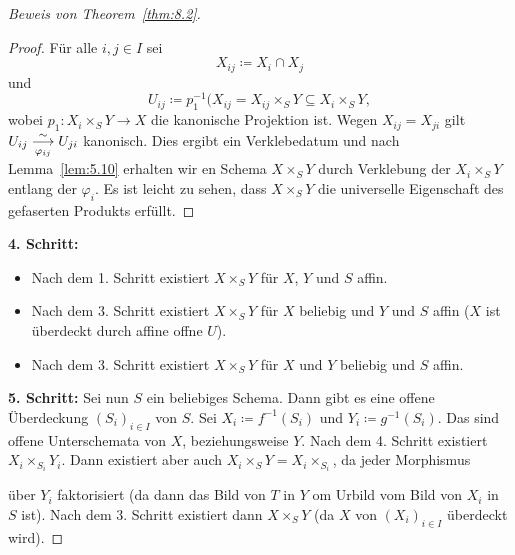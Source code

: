 \begin{proof}[Beweis von Theorem~\ref{thm:8.2}]
	\begin{proof}
		Für alle $i,j \in I$ sei
		\[
			X_{ij} \coloneqq X_i \cap X_j
		\]
		und
		\[
			U_{ij} \coloneqq p_1^{-1}(X_{ij} = X_{ij}\times_S Y \subseteq X_i \times_S Y,
		\]
		wobei $p_1 \colon X_i \times_S Y \to X$ die kanonische Projektion ist. Wegen $X_{ij} = X_{ji}$ gilt $U_{ij} \underset{\varphi_{ij}}{\overset{\sim}{\longrightarrow}}U_{ji}$ kanonisch. Dies ergibt ein Verklebedatum und nach Lemma~\ref{lem:5.10} erhalten wir en Schema $X\times_S Y$ durch Verklebung der $X_i\times_S Y$ entlang der $\varphi_{i}$. Es ist leicht zu sehen, dass $X \times_S Y$ die universelle Eigenschaft des gefaserten Produkts erfüllt.
	\end{proof}
	\textbf{4. Schritt:}\\
	\begin{itemize}
		\item Nach dem 1. Schritt existiert $X \times_S Y$ für $X$, $Y$ und $S$ affin.\\
		\item Nach dem 3. Schritt existiert $X \times_S Y$ für $X$ beliebig und $Y$ und $S$ affin ($X$ ist überdeckt durch affine offne $U$).
		\item Nach dem 3. Schritt existiert $X \times_S Y$ für $X$ und $Y$ beliebig und $S$ affin.
	\end{itemize}
	\textbf{5. Schritt:} Sei nun $S$ ein beliebiges Schema. Dann gibt es eine offene Überdeckung $(S_i)_{i \in I}$ von $S$. Sei $X_i \coloneqq f^{-1}(S_i)$ und $Y_i\coloneqq g^{-1}(S_i)$. Das sind offene Unterschemata von $X$, beziehungsweise $Y$. Nach dem 4. Schritt existiert $X_i \times_{S_i} Y_i$. Dann existiert aber auch $X_i\times_S Y = X_i \times_{S_i}$, da jeder Morphismus
	\begin{center}
	\end{center}
	über $Y_i$ faktorisiert (da dann das Bild von $T$ in $Y$ om Urbild vom Bild von $X_i$ in $S$ ist). Nach dem 3. Schritt existiert dann $X\times_S Y$ (da $X$ von $(X_i)_{i \in I}$ überdeckt wird).
\end{proof}

